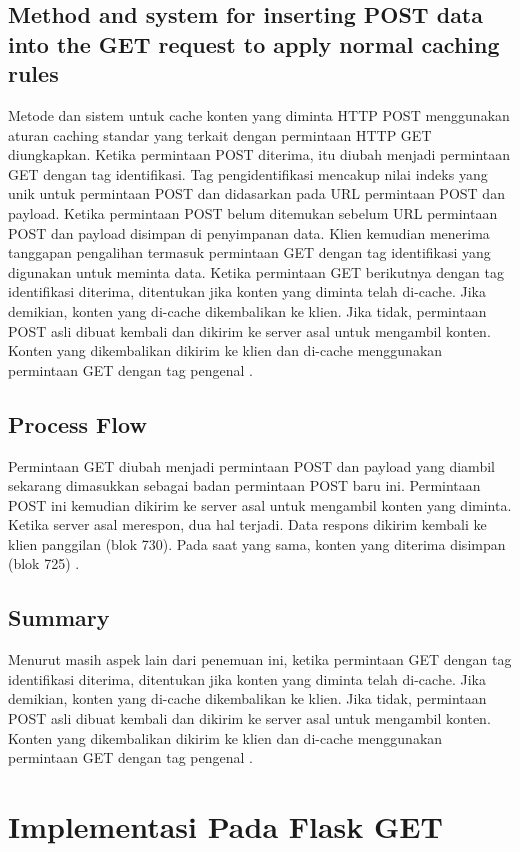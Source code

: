 \subsection{Method and system for inserting POST data into the GET request to apply normal caching rules}
Metode dan sistem untuk cache konten yang diminta HTTP POST menggunakan aturan caching standar yang terkait dengan permintaan HTTP GET diungkapkan. Ketika permintaan POST diterima, itu diubah menjadi permintaan GET dengan tag identifikasi. Tag pengidentifikasi mencakup nilai indeks yang unik untuk permintaan POST dan didasarkan pada URL permintaan POST dan payload. Ketika permintaan POST belum ditemukan sebelum URL permintaan POST dan payload disimpan di penyimpanan data. Klien kemudian menerima tanggapan pengalihan termasuk permintaan GET dengan tag identifikasi yang digunakan untuk meminta data. Ketika permintaan GET berikutnya dengan tag identifikasi diterima, ditentukan jika konten yang diminta telah di-cache. Jika demikian, konten yang di-cache dikembalikan ke klien. Jika tidak, permintaan POST asli dibuat kembali dan dikirim ke server asal untuk mengambil konten. Konten yang dikembalikan dikirim ke klien dan di-cache menggunakan permintaan GET dengan tag pengenal \cite{sloat2009method}.
\subsection{Process Flow}
Permintaan GET diubah menjadi permintaan POST dan payload yang diambil sekarang dimasukkan sebagai badan permintaan POST baru ini. Permintaan POST ini kemudian dikirim ke server asal untuk mengambil konten yang diminta. Ketika server asal merespon, dua hal terjadi. Data respons dikirim kembali ke klien panggilan (blok 730). Pada saat yang sama, konten yang diterima disimpan (blok 725) \cite{sloat2009method}.
\subsection{Summary}
Menurut masih aspek lain dari penemuan ini, ketika permintaan GET dengan tag identifikasi diterima, ditentukan jika konten yang diminta telah di-cache. Jika demikian, konten yang di-cache dikembalikan ke klien. Jika tidak, permintaan POST asli dibuat kembali dan dikirim ke server asal untuk mengambil konten. Konten yang dikembalikan dikirim ke klien dan di-cache menggunakan permintaan GET dengan tag pengenal \cite{sloat2009method}.

\section{Implementasi Pada Flask GET}
